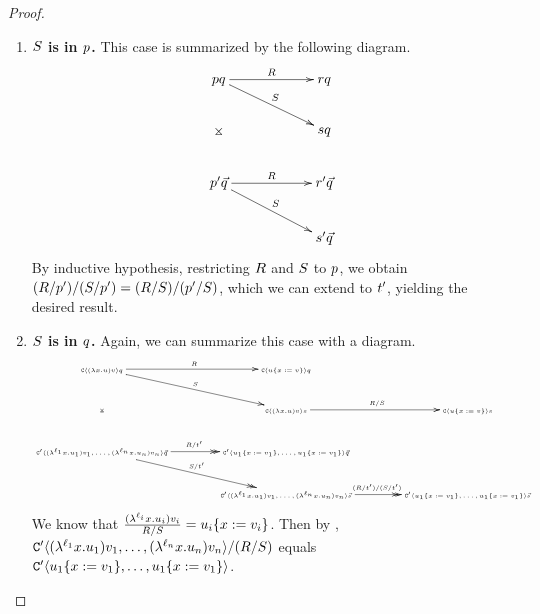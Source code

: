 \begin{proof}
\begin{gonzaenv}
\begin{enumerate}
\begin{enumerate}
\begin{enumerate}
          \item {\bf $S$ is in $p$.} This case is summarized by the following diagram.
            \[
            \xymatrix@C=2cm{
              \tmfive \tmsix
                \ar@{->}[r]^{\redex} \ar@{->}[rd]^{\redextwo} \ar@{}[dd]|*=0[@]{\rtimes}
                  & \tmfour \tmsix \\
                & \tmtwo \tmsix \\
                \ar@{->}[r]^{\redex} \ar@{->}[rd]^{\redextwo}
              \tmfive' \ls{\tmsix}
                  & \tmfour' \ls{\tmsix} \\
                & \tmtwo' \ls{\tmsix} \\
              }
            \]
            By inductive hypothesis, restricting $R$ and $S$ to $p$, we obtain
            $(R / p') / (S / p') = (R / S) / (p' / S)$,
            which we can extend to $t'$, yielding the desired result.
          \item {\bf $S$ is in $q$.} Again, we can summarize this case with a diagram.
            \[
            {\tiny
            \xymatrix@C=1.4cm{
              \conof{(\lam{\var}{\tmthree}) \tmthreevariant} \tmsix
                \ar@{->}[r]^{\redex} \ar@{->}[rd]^{\redextwo} \ar@{}[dd]|*=0[@]{\rtimes}
                  & \conof{\subs{\tmthree}{\var}{\tmthreevariant}} \tmsix  & \\
                & \conof{(\lam{\var}{\tmthree}) \tmthreevariant} \tmtwo \ar@{->}[r]^{\redex / \redextwo}
                    & \conof{\subs{\tmthree}{\var}{\tmthreevariant}} \tmtwo \\
                \ar@{->>}[r]^{\redex / \tm'} \ar@{->>}[rd]^{\redextwo / \tm'}
              \contwoof{(\lamp{\lab_1}{\var}{\tmthree_1}) \tmthreevariant_1, \hdots, (\lamp{\lab_n}{\var}{\tmthree_n}) \tmthreevariant_n} \ls{\tmsix}
                  & \contwoof{\subs{\tmthree_1}{\var}{\tmthreevariant_1}, \hdots, \subs{\tmthree_1}{\var}{\tmthreevariant_1}} \ls{\tmsix} & \\
                & \contwoof{(\lamp{\lab_1}{\var}{\tmthree_1}) \tmthreevariant_1, \hdots, (\lamp{\lab_n}{\var}{\tmthree_n}) \tmthreevariant_n} \ls{\tmtwo} \ar@{->>}[r]^{(\redex / \tm') / (\redextwo / \tm')}
                  & \contwoof{\subs{\tmthree_1}{\var}{\tmthreevariant_1}, \hdots, \subs{\tmthree_1}{\var}{\tmthreevariant_1}} \ls{\tmtwo} \\
              }
            }
            \]
            We know that $\frac{(\lambda^{\ell_i} x. u_i) v_i}{R / S}
             = u_i\{x := v_i\}$.
            Then by ,
            $\mathtt{C}'\langle(\lambda^{\ell_1} x. u_1) v_1, \hdots, (\lambda^{\ell_n} x. u_n) v_n\rangle / (R / S)$ equals
            $\mathtt{C}'\langle u_1\{x := v_1\}, \hdots, u_1\{x := v_1\}\rangle$.


\end{enumerate}
\end{enumerate}
\end{enumerate}
\end{gonzaenv}
\end{proof}
